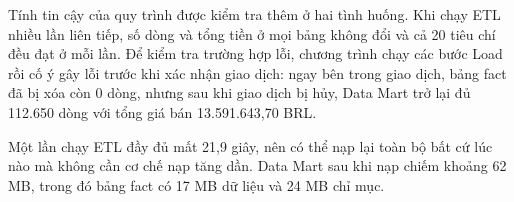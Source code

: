 Tính tin cậy của quy trình được kiểm tra thêm ở hai tình huống. Khi chạy ETL nhiều lần liên tiếp, số dòng và tổng tiền ở mọi bảng không đổi và cả 20 tiêu chí đều đạt ở mỗi lần. Để kiểm tra trường hợp lỗi, chương trình  chạy các bước Load rồi cố ý gây lỗi trước khi xác nhận giao dịch: ngay bên trong giao dịch, bảng fact đã bị xóa còn 0 dòng, nhưng sau khi giao dịch bị hủy, Data Mart trở lại đủ 112.650 dòng với tổng giá bán 13.591.643,70 BRL.

Một lần chạy ETL đầy đủ mất 21,9 giây, nên có thể nạp lại toàn bộ bất cứ lúc nào mà không cần cơ chế nạp tăng dần. Data Mart sau khi nạp chiếm khoảng 62 MB, trong đó bảng fact có 17 MB dữ liệu và 24 MB chỉ mục.
